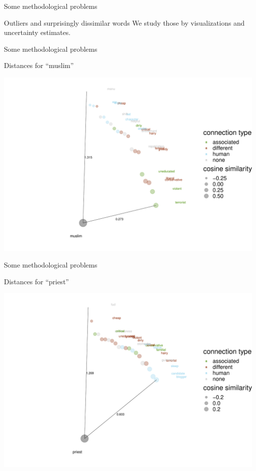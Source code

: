 \documentclass[
  10pt,
  ignorenonframetext,
  x11names, dvipsnames, bibspacing,natbib, table]{beamer}
\begin{document}
\begin{frame}{Some methodological problems}
\protect\hypertarget{some-methodological-problems-3}{}
\begin{block}{Outliers and surprisingly dissimilar words}
\protect\hypertarget{outliers-and-surprisingly-dissimilar-words}{}
We study those by visualizations and uncertainty estimates.
\end{block}
\end{frame}

\begin{frame}{Some methodological problems}
\protect\hypertarget{some-methodological-problems-4}{}
\begin{block}{Distances for ``muslim''}
\protect\hypertarget{distances-for-muslim}{}
\begin{center}\includegraphics[width=0.8\linewidth]{presentationBoston_files/figure-beamer/unnamed-chunk-4-1} \end{center}
\end{block}
\end{frame}

\begin{frame}{Some methodological problems}
\protect\hypertarget{some-methodological-problems-5}{}
\begin{block}{Distances for ``priest''}
\protect\hypertarget{distances-for-priest}{}
\begin{center}\includegraphics[width=0.8\linewidth]{presentationBoston_files/figure-beamer/unnamed-chunk-5-1} \end{center}
\end{block}
\end{frame}
\end{document}

